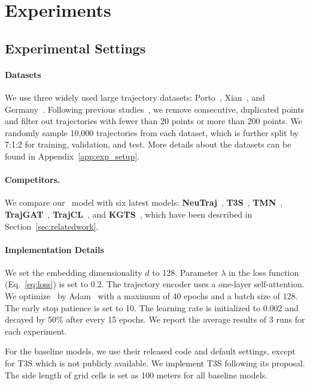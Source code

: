 \section{Experiments}\label{sec:exp}

\subsection{Experimental Settings}\label{subsec:exp:setting}

\paragraph{Datasets} We use three widely used large trajectory datasets: Porto~\cite{porto}, Xian~\cite{didi}, and Germany~\cite{osmplanet}.
Following previous studies~\cite{neutraj,t3s,trajgat,trajcl}, we remove consecutive, duplicated points and filter out trajectories with fewer than 20 points or more than 200 points. 
We randomly sample 10,000 trajectories from each dataset, which is further split by 7:1:2 for training, validation, and test.
More details about the datasets can be found in Appendix~\ref{app:exp_setup}.

\paragraph{Competitors.}
We compare our \model\ model with six latest models: \textbf{NeuTraj}~\cite{neutraj}, \textbf{T3S}~\cite{t3s}, \textbf{TMN}~\cite{tmn}, \textbf{TrajGAT}~\cite{trajgat}, 
\textbf{TrajCL}~\cite{trajcl}, and 
\textbf{KGTS}~\cite{kgts}, which have been described in Section~\ref{sec:relatedwork}.


\paragraph{Implementation Details} 
We set the embedding dimensionality $d$ to 128. Parameter $\lambda$ in the loss function (Eq.~\eqref{eq:loss}) is set to 0.2. The trajectory encoder uses a one-layer self-attention.
We optimize \model\ by Adam~\cite{adam} with a maximum of 40 epochs and a batch size of 128. The early stop patience is set to 10.
The learning rate is initialized to 0.002 and decayed by 50\% after every 15 epochs. 
We report the average results of 3 runs for each experiment.

For the baseline models, we use their released code and default  settings, except for T3S which is not publicly available. We implement T3S following its proposal. The side length of grid cells is set as 100 meters for all baseline models.


